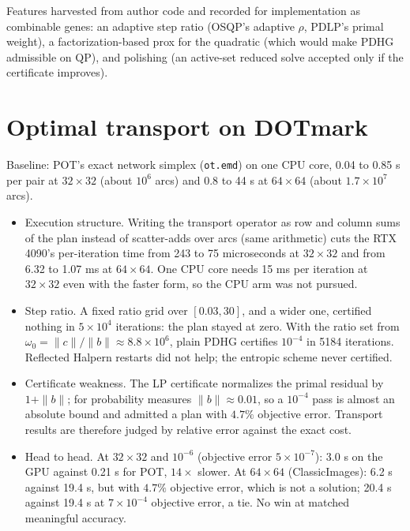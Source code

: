 \documentclass[11pt]{article}
\begin{document}
Features harvested from author code and recorded for implementation as
combinable genes: an adaptive step ratio (OSQP's adaptive $\rho$, PDLP's
primal weight), a factorization-based prox for the quadratic (which would
make PDHG admissible on QP), and polishing (an active-set reduced solve
accepted only if the certificate improves).

\section{Optimal transport on DOTmark}
\label{app:log:ot}

 Baseline: POT's exact
network simplex (\texttt{ot.emd}) on one CPU core, 0.04 to 0.85 s per pair at
$32\times32$ (about $10^6$ arcs) and 0.8 to 44 s at $64\times64$ (about
$1.7\times10^7$ arcs).

\begin{itemize}
\item Execution structure. Writing the transport operator as row and column
 sums of the plan instead of scatter-adds over arcs (same arithmetic)
 cuts the RTX 4090's per-iteration time from 243 to 75 microseconds at
 $32\times32$ and from 6.32 to 1.07 ms at $64\times64$. One CPU core needs
 15 ms per iteration at $32\times32$ even with the faster form, so the CPU
 arm was not pursued.
\item Step ratio. A fixed ratio grid over $[0.03, 30]$, and a wider one, certified
 nothing in $5\times10^4$ iterations: the plan stayed at zero. With the ratio
 set from $\omega_0 = \|c\|/\|b\| \approx 8.8\times10^6$, plain PDHG certifies
 $10^{-4}$ in 5184 iterations. Reflected Halpern restarts did not help; the
 entropic scheme never certified.
\item Certificate weakness. The LP certificate normalizes the primal residual
 by $1+\|b\|$; for probability measures $\|b\|\approx0.01$, so a $10^{-4}$
 pass is almost an absolute bound and admitted a plan with $4.7\%$
 objective error. Transport results are therefore judged by relative error
 against the exact cost.
\item Head to head. At $32\times32$ and $10^{-6}$ (objective error
 $5\times10^{-7}$): 3.0 s on the GPU against 0.21 s for POT, $14\times$
 slower. At $64\times64$ (ClassicImages): 6.2 s against 19.4 s, but with
 $4.7\%$ objective error, which is not a solution; 20.4 s against 19.4 s at
 $7\times10^{-4}$ objective error, a tie. No win at matched meaningful
 accuracy.
\end{itemize}
\end{document}
